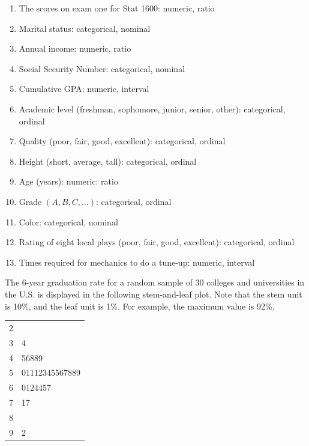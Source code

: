 \documentclass[11pt, chapterprefix=true]{scrbook}\usepackage[]{graphicx}\usepackage[]{color}
\begin{document}
\begin{exercises}
\begin{solution}
    \begin{enumerate}
	  \item The scores on exam one for Stat 1600:  numeric, ratio
    \item Marital status: categorical, nominal
    \item Annual income: numeric, ratio
    \item Social Security Number: categorical, nominal
    \item Cumulative GPA: numeric, interval
    \item Academic level (freshman, sophomore, junior, senior, other): categorical, ordinal
    \item Quality (poor, fair, good, excellent): categorical, ordinal
    \item Height (short, average, tall): categorical, ordinal
    \item Age (years): numeric: ratio
    \item Grade $(A, B, C, \dots)$: categorical, ordinal
    \item Color: categorical, nominal
    \item Rating of eight local plays (poor, fair, good, excellent): categorical, ordinal
    \item Times required for mechanics to do a tune-up: numeric, interval
  	\end{enumerate}
  \end{solution}

  \begin{exercise} %



The 6-year graduation rate for a random sample of 30 colleges and universities
in the U.S. is displayed in the following stem-and-leaf plot.  Note that the stem unit is 10\%, and the leaf unit is 1\%.  For example, the maximum value is 92\%.

\begin{tabular}{@{} r|l @{}} \hline
2 & \\
3 & 4 \\
4 & 56889 \\
5 & 01112345567889 \\
6 & 0124457 \\
7 & 17 \\
8 & \\
9 & 2 \\ \hline
\end{tabular}


\end{exercise}
\end{exercises}
\end{document}

